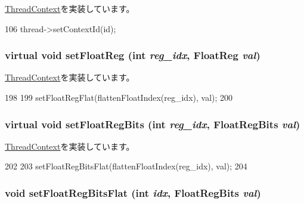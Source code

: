 \hyperlink{classThreadContext_a60a9383e4a460807756f2de9f5215582}{ThreadContext}を実装しています。


\begin{DoxyCode}
106 { thread->setContextId(id); }
\end{DoxyCode}
\hypertarget{classO3ThreadContext_a6da554ea484b758c095389b1373ffccc}{
\subsubsection[{setFloatReg}]{\setlength{\rightskip}{0pt plus 5cm}virtual void setFloatReg (int {\em reg\_\-idx}, \/  {\bf FloatReg} {\em val})}}
\label{classO3ThreadContext_a6da554ea484b758c095389b1373ffccc}


\hyperlink{classThreadContext_af8dc9762fda519d911372dd6f4a28d8e}{ThreadContext}を実装しています。


\begin{DoxyCode}
198                                                         {
199         setFloatRegFlat(flattenFloatIndex(reg_idx), val);
200     }
\end{DoxyCode}
\hypertarget{classO3ThreadContext_a2efe7073c68c7a9ab031aa829b5712a5}{
\subsubsection[{setFloatRegBits}]{\setlength{\rightskip}{0pt plus 5cm}virtual void setFloatRegBits (int {\em reg\_\-idx}, \/  {\bf FloatRegBits} {\em val})}}
\label{classO3ThreadContext_a2efe7073c68c7a9ab031aa829b5712a5}


\hyperlink{classThreadContext_a8f0c8b07cd1c4a6019a5b3922689d1db}{ThreadContext}を実装しています。


\begin{DoxyCode}
202                                                                 {
203         setFloatRegBitsFlat(flattenFloatIndex(reg_idx), val);
204     }
\end{DoxyCode}
\hypertarget{classO3ThreadContext_acd974292ff0461c2e94c0b5a1126b503}{
\subsubsection[{setFloatRegBitsFlat}]{\setlength{\rightskip}{0pt plus 5cm}void setFloatRegBitsFlat (int {\em idx}, \/  {\bf FloatRegBits} {\em val})}}
\label{classO3ThreadContext_acd974292ff0461c2e94c0b5a1126b503}


